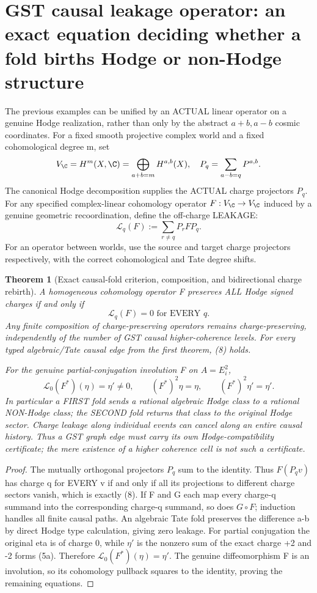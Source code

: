 \documentclass[11pt]{article}
\newtheorem{theorem}{Theorem}
\begin{document}
\section{GST causal leakage operator: an exact equation deciding whether a fold births Hodge or non-Hodge structure}
The previous
examples can
be unified by
an ACTUAL
linear
operator on
a genuine
Hodge realization,
rather than
only by the
abstract
\(a+b,a-b\)
cosmic coordinates.
For a fixed
smooth projective
complex world
and a fixed
cohomological
degree m, set
\[
 V_{\C}=H^m(X,\C)
   =\bigoplus_{a+b=m}H^{a,b}(X),
\quad
 P_q=\sum_{a-b=q}
        P^{a,b}.
\]
The canonical
Hodge decomposition
supplies the
ACTUAL
charge
projectors
\(P_q\).
For any
specified
complex-linear
cohomology
operator
\(F:V_{\C}\to V_{\C}\)
induced by a
genuine
geometric
recoordination,
define the
off-charge
LEAKAGE:
\[
 \boxed{
 \mathcal L_q(F)
  :=\sum_{r\ne q}P_r F P_q.
 }                                                        \tag{7}
\]
For an operator
between worlds,
use the
source and
target
charge
projectors
respectively,
with the
correct
cohomological
and Tate
degree shifts.

\begin{theorem}[Exact causal-fold criterion, composition, and bidirectional charge rebirth]
A homogeneous
cohomology
operator F
preserves ALL
Hodge signed
charges if and
only if
\[
 \boxed{
       \mathcal L_q(F)=0
                  \text{ for EVERY }q.
 }                                                        \tag{8}
\]
Any finite
composition of
charge-preserving
operators
remains
charge-preserving,
independently
of the number
of GST causal
higher-coherence
levels.
For every
typed
algebraic/Tate
causal edge
from the
first theorem,
(8) holds.

For the
genuine
partial-conjugation
involution F
on
\(A=E_i^2\),
\[
 \boxed{
 \mathcal L_0(F^*)(\eta)=\eta'\ne0,
 \qquad
 (F^*)^2\eta=\eta,\qquad
 (F^*)^2\eta'=\eta'.
 }                                                        \tag{9}
\]
In particular
a FIRST
fold sends a
rational
algebraic
Hodge class
to a rational
NON-Hodge
class;
the SECOND
fold returns
that class to
the original
Hodge sector.
Charge leakage
along individual
events can
cancel along
an entire
causal history.
Thus a GST
graph edge
must carry
its own
Hodge-compatibility
certificate;
the mere
existence of
a higher
coherence
cell is not
such a
certificate.
\end{theorem}
\begin{proof}
The mutually
orthogonal
projectors
\(P_q\)
sum to the
identity.
Thus
\(F(P_qv)\)
has charge q
for EVERY v
if and only if
all its
projections to
different charge
sectors vanish,
which is
exactly (8).
If F and G
each map
every
charge-q
summand into
the corresponding
charge-q
summand,
so does
\(G\circ F\);
induction
handles
all finite
causal paths.
An algebraic
Tate fold
preserves the
difference a-b
by direct
Hodge type
calculation,
giving zero
leakage.
For partial
conjugation
the original
eta is of
charge 0,
while
\(\eta'\)
is the nonzero
sum of
the exact
charge +2
and -2
forms (5a).
Therefore
\(\mathcal L_0(F^*)(\eta)
=\eta'\).
The genuine
diffeomorphism F
is an involution,
so its
cohomology
pullback squares
to the
identity,
proving the
remaining
equations.
\end{proof}
\end{document}
